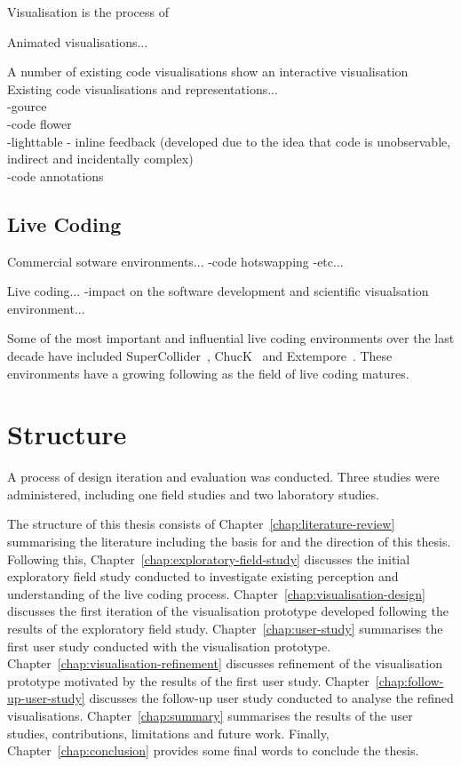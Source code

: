 Visualisation is the process of 

Animated visualisations...

A number of existing code visualisations show an interactive visualisation Existing code visualisations and representations...\\
-gource~\cite{Caudwell2010}\\
-code flower\\
-lighttable - inline feedback (developed due to the idea that code is unobservable, indirect and incidentally complex) \\
-code annotations~\cite{Swift2013}

\subsection{Live Coding}

Commercial sotware environments...
-code hotswapping
-etc...

Live coding...
-impact on the software development and scientific visualsation environment...

Some of the most important and influential live coding environments over the last decade have included SuperCollider~\cite{McCartney}, ChucK~\cite{Wang2008} and Extempore~\cite{Sorensen}. These environments have a growing following as the field of live coding matures.

\section{Structure}

A process of design iteration and evaluation was conducted. Three studies were administered, including one field studies and two laboratory studies.

The structure of this thesis consists of Chapter~\ref{chap:literature-review} summarising the literature including the basis for and the direction of this thesis. Following this, Chapter~\ref{chap:exploratory-field-study} discusses the initial exploratory field study conducted to investigate existing perception and understanding of the live coding process. Chapter~\ref{chap:visualisation-design} discusses the first iteration of the visualisation prototype developed following the results of the exploratory field study. Chapter~\ref{chap:user-study} summarises the first user study conducted with the visualisation prototype. Chapter~\ref{chap:visualisation-refinement} discusses refinement of the visualisation prototype motivated by the results of the first user study. Chapter~\ref{chap:follow-up-user-study} discusses the follow-up user study conducted to analyse the refined visualisations. Chapter~\ref{chap:summary} summarises the results of the user studies, contributions, limitations and future work. Finally, Chapter~\ref{chap:conclusion} provides some final words to conclude the thesis.





